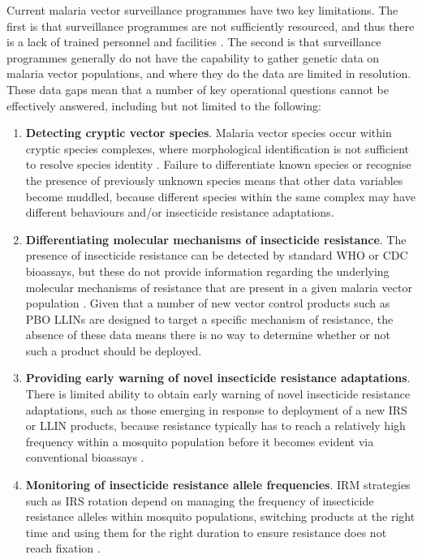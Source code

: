 \documentclass[a4paper,11pt,abstracton,hidelinks]{scrartcl}
\begin{document}
Current malaria vector surveillance programmes have two key limitations.
%
The first is that surveillance programmes are not sufficiently resourced, and thus there is a lack of trained personnel and facilities \citep{Russell2020}.
%
The second is that surveillance programmes generally do not have the capability to gather genetic data on malaria vector populations, and where they do the data are limited in resolution.
%
These data gaps mean that a number of key operational questions cannot be effectively answered, including but not limited to the following:
\begin{enumerate}
%
\item \textbf{Detecting cryptic vector species}. 
%
Malaria vector species occur within cryptic species complexes, where morphological identification is not sufficient to resolve species identity \citep{Davidson1964,Coetzee2013}. 
%
Failure to differentiate known species or recognise the presence of previously unknown species means that other data variables become muddled, because different species within the same complex may have different behaviours and/or insecticide resistance adaptations.
%
\item \textbf{Differentiating molecular mechanisms of insecticide resistance}.
%
The presence of insecticide resistance can be detected by standard WHO or CDC bioassays, but these do not provide information regarding the underlying molecular mechanisms of resistance that are present in a given malaria vector population \citep{WHO2018TPIRM}.
%
Given that a number of new vector control products such as PBO LLINs are designed to target a specific mechanism of resistance, the absence of these data means there is no way to determine whether or not such a product should be deployed.
%
\item \textbf{Providing early warning of novel insecticide resistance adaptations}.
%
There is limited ability to obtain early warning of novel insecticide resistance adaptations, such as those emerging in response to deployment of a new IRS or LLIN products, because resistance typically has to reach a relatively high frequency within a mosquito population before it becomes evident via conventional bioassays \citep{Roush1986,Sternberg2018}.
%
\item \textbf{Monitoring of insecticide resistance allele frequencies}.
%
IRM strategies such as IRS rotation depend on managing the frequency of insecticide resistance alleles within mosquito populations, switching products at the right time and using them for the right duration to ensure resistance does not reach fixation \citep{South2018}. 

\end{enumerate}
\end{document}
